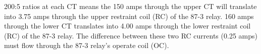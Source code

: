200:5 ratios at each CT means the 150 amps through the upper CT will translate into 3.75 amps through the upper restraint coil (RC) of the 87-3 relay.  160 amps through the lower CT translates into 4.00 amps through the lower restraint coil (RC) of the 87-3 relay.  The difference between these two RC currents (0.25 amps) must flow through the 87-3 relay's operate coil (OC).










